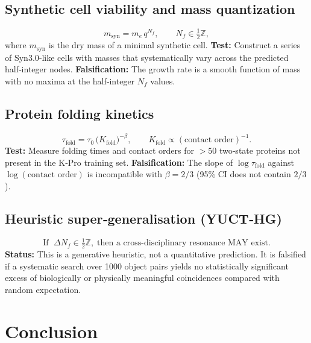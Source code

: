\documentclass[11pt,a4paper]{article}
\begin{document}
\subsection{Synthetic cell viability and mass quantization}

\begin{equation}\label{eq:pred-syn}
	m_{\mathrm{syn}} = m_e\,q^{N_f},\qquad N_f\in\tfrac12\mathbb{Z},
\end{equation}
where $m_{\mathrm{syn}}$ is the dry mass of a minimal synthetic
cell.
\textbf{Test:} Construct a series of Syn3.0‑like cells with masses
that systematically vary across the predicted half‑integer nodes.
\textbf{Falsification:} The growth rate is a smooth function of
mass with no maxima at the half‑integer $N_f$ values.

\subsection{Protein folding kinetics}

\begin{equation}\label{eq:pred-fold}
	\tau_{\mathrm{fold}} = \tau_0\,
	\bigl(K_{\mathrm{fold}}\bigr)^{-\beta},\qquad
	K_{\mathrm{fold}} \propto (\text{contact order})^{-1}.
\end{equation}
\textbf{Test:} Measure folding times and contact orders for $>50$
two‑state proteins not present in the K‑Pro training set.
\textbf{Falsification:} The slope of $\log\tau_{\mathrm{fold}}$
against $\log(\text{contact order})$ is incompatible with
$\beta=2/3$ (95\% CI does not contain $2/3$).

\subsection{Heuristic super‑generalisation (YUCT‑HG)}

\begin{equation}\label{eq:pred-hg}
	\text{If }\; \Delta N_f \in \tfrac12\mathbb{Z},\;
	\text{then a cross‑disciplinary resonance MAY exist.}
\end{equation}
\textbf{Status:} This is a generative heuristic, not a quantitative
prediction. It is falsified if a systematic search over 1000
object pairs yields no statistically significant excess of
biologically or physically meaningful coincidences compared with
random expectation.
	
	\section{Conclusion}
	
\end{document}
